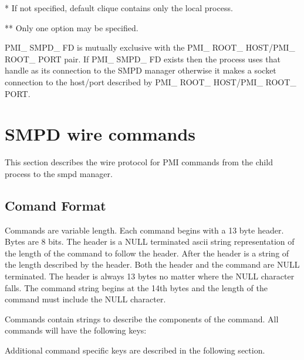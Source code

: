\documentclass{article}
\begin{document}
* If not specified, default clique contains only the local process.

** Only one option may be specified.

PMI\_ SMPD\_ FD is mutually exclusive with the 
PMI\_ ROOT\_ HOST/PMI\_ ROOT\_ PORT pair.  If PMI\_ SMPD\_ FD exists then 
the process uses that handle as its connection to the SMPD manager 
otherwise it makes a socket connection to the
host/port described by PMI\_ ROOT\_ HOST/PMI\_ ROOT\_ PORT.

\section{SMPD wire commands}
This section describes the wire protocol for PMI commands from the child
process to the smpd manager.

\subsection{Comand Format}
Commands are variable length.
Each command begins with a 13 byte header.  Bytes are 8 bits.  The header 
is a NULL terminated ascii string representation of the length of the 
command to follow the header.  After the header is a string of the length 
described by the header.  Both the header and the command are NULL terminated.
The header is always 13 bytes no matter where the NULL character falls.  The
command string begins at the 14th bytes and the length of the command must 
include the NULL character.

Commands contain  strings to describe the components of 
the command.  All commands will have the following keys:


Additional command specific keys are described in the following section.
\end{document}
